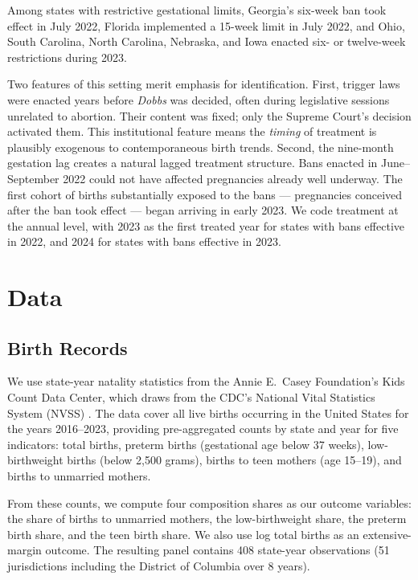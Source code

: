 \documentclass[12pt]{article}
\begin{document}
Among states with restrictive gestational limits, Georgia's six-week ban took effect in July 2022, Florida implemented a 15-week limit in July 2022, and Ohio, South Carolina, North Carolina, Nebraska, and Iowa enacted six- or twelve-week restrictions during 2023.

Two features of this setting merit emphasis for identification. First, trigger laws were enacted years before \emph{Dobbs} was decided, often during legislative sessions unrelated to abortion. Their content was fixed; only the Supreme Court's decision activated them. This institutional feature means the \emph{timing} of treatment is plausibly exogenous to contemporaneous birth trends. Second, the nine-month gestation lag creates a natural lagged treatment structure. Bans enacted in June--September 2022 could not have affected pregnancies already well underway. The first cohort of births substantially exposed to the bans --- pregnancies conceived after the ban took effect --- began arriving in early 2023. We code treatment at the annual level, with 2023 as the first treated year for states with bans effective in 2022, and 2024 for states with bans effective in 2023.


\section{Data}
\label{sec:data}

\subsection{Birth Records}

We use state-year natality statistics from the Annie E.\ Casey Foundation's Kids Count Data Center, which draws from the CDC's National Vital Statistics System (NVSS) \citep{kidscountdata}. The data cover all live births occurring in the United States for the years 2016--2023, providing pre-aggregated counts by state and year for five indicators: total births, preterm births (gestational age below 37 weeks), low-birthweight births (below 2,500 grams), births to teen mothers (age 15--19), and births to unmarried mothers.

From these counts, we compute four composition shares as our outcome variables: the share of births to unmarried mothers, the low-birthweight share, the preterm birth share, and the teen birth share. We also use log total births as an extensive-margin outcome. The resulting panel contains 408 state-year observations (51 jurisdictions including the District of Columbia over 8 years).
\end{document}
